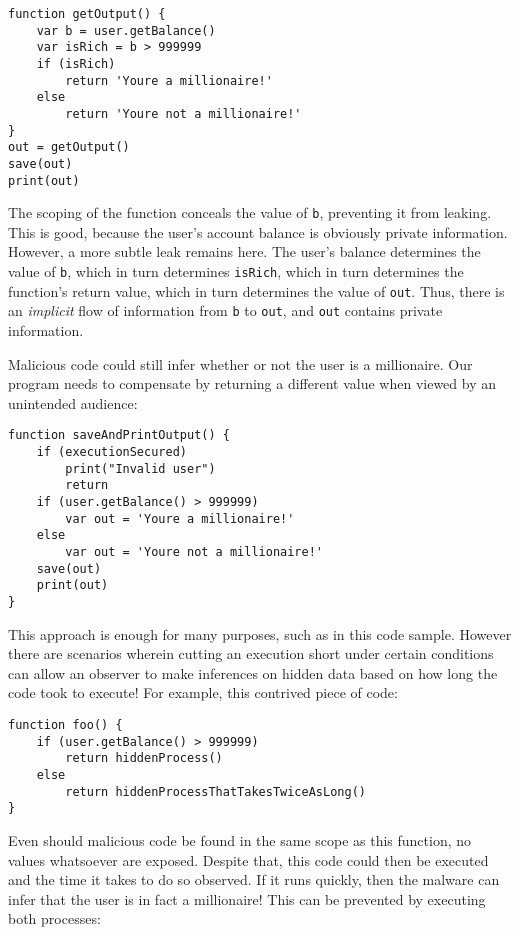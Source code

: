 \documentclass[12pt,a4paper]{article}
\begin{document}
		\begin{lstlisting}
function getOutput() {
	var b = user.getBalance()
	var isRich = b > 999999
	if (isRich)
		return 'Youre a millionaire!'
	else
		return 'Youre not a millionaire!'
}
out = getOutput()
save(out)
print(out)
		\end{lstlisting}
		
		The scoping of the function conceals the value of \lstinline{b}, preventing it from leaking. This is good, because the user's account balance is obviously private information. However, a more subtle leak remains here. The user's balance determines the value of \lstinline{b}, which in turn determines \lstinline{isRich}, which in turn determines the function's return value, which in turn determines the value of \lstinline{out}. Thus, there is an \textit{implicit} flow of information from \lstinline{b} to \lstinline{out}, and \lstinline{out} contains private information. 
		
		Malicious code could still infer whether or not the user is a millionaire. Our program needs to compensate by returning a different value when viewed by an unintended audience:
		
		\begin{lstlisting}
function saveAndPrintOutput() {
	if (executionSecured)
		print("Invalid user")
		return
	if (user.getBalance() > 999999)
		var out = 'Youre a millionaire!'
	else
		var out = 'Youre not a millionaire!'
	save(out)
	print(out)
}
		\end{lstlisting}
		
		This approach is enough for many purposes, such as in this code sample. However there are scenarios wherein cutting an execution short under certain conditions can allow an observer to make inferences on hidden data based on how long the code took to execute! For example, this contrived piece of code:
		
		\begin{lstlisting}
function foo() {
	if (user.getBalance() > 999999)
		return hiddenProcess()
	else
		return hiddenProcessThatTakesTwiceAsLong()
}
		\end{lstlisting}
		
		Even should malicious code be found in the same scope as this function, no values whatsoever are exposed. Despite that, this code could then be executed and the time it takes to do so observed. If it runs quickly, then the malware can infer that the user is in fact a millionaire! This can be prevented by executing both processes:
		
\end{document}
